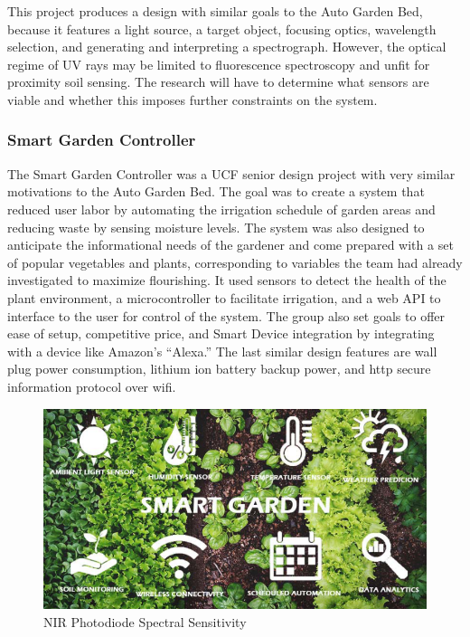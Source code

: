This project produces a design with similar goals to the Auto Garden Bed, because it features a light source, a target object, focusing optics, wavelength selection, and generating and interpreting a spectrograph. However, the optical regime of UV rays may be limited to fluorescence spectroscopy and unfit for proximity soil sensing. The research will have to determine what sensors are viable and whether this imposes further constraints on the system.

\subsubsection{Smart Garden Controller}
The Smart Garden Controller was a UCF senior design project with very similar motivations to the Auto Garden Bed. The goal was to create a system that reduced user labor by automating the irrigation schedule of garden areas and reducing waste by sensing moisture levels. The system was also designed to anticipate the informational needs of the gardener and come prepared with a set of popular vegetables and plants, corresponding to variables the team had already investigated to maximize flourishing. It used sensors to detect the health of the plant environment, a microcontroller to facilitate irrigation, and a web API to interface to the user for control of the system. The group also set goals to offer ease of setup, competitive price, and Smart Device integration by integrating with a device like Amazon’s “Alexa.” The last similar design features are wall plug power consumption, lithium ion battery backup power, and http secure information protocol over wifi.
\begin{figure}[H]
    \caption{NIR Photodiode Spectral Sensitivity}
    \centering
    \includegraphics[width=\textwidth]{images/3.1.3Pic.png}
\end{figure}
